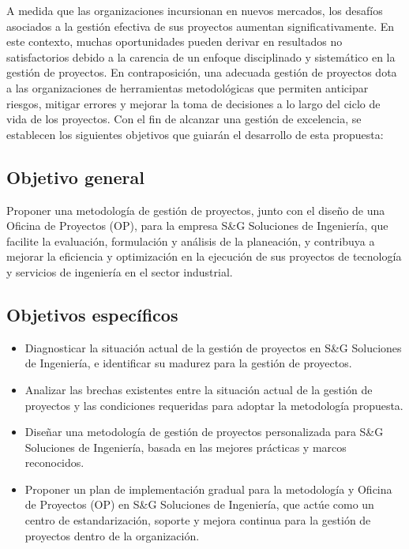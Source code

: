 \begin{flushleft}
A medida que las organizaciones incursionan en nuevos mercados, los desafíos asociados a la gestión efectiva de sus proyectos aumentan significativamente. En este contexto, muchas oportunidades pueden derivar en resultados no satisfactorios debido a la carencia de un enfoque disciplinado y sistemático en la gestión de proyectos. En contraposición, una adecuada gestión de proyectos dota a las organizaciones de herramientas metodológicas que permiten anticipar riesgos, mitigar errores y mejorar la toma de decisiones a lo largo del ciclo de vida de los proyectos.
Con el fin de alcanzar una gestión de excelencia, se establecen los siguientes objetivos que guiarán el desarrollo de esta propuesta:

\subsection*{Objetivo general}
Proponer una metodología de gestión de proyectos, junto con el diseño de una Oficina de Proyectos (OP), para la empresa S\&G Soluciones de Ingeniería, que facilite la evaluación, formulación y análisis de la planeación, y contribuya a mejorar la eficiencia y optimización en la ejecución de sus proyectos de tecnología y servicios de ingeniería en el sector industrial. 

\subsection*{Objetivos específicos}
\begin{itemize}
    \item Diagnosticar la situación actual de la gestión de proyectos en S\&G Soluciones de Ingeniería, e identificar su madurez para la gestión de proyectos.
    \item Analizar las brechas existentes entre la situación actual de la gestión de proyectos y las condiciones requeridas para adoptar la metodología propuesta.
    \item Diseñar una metodología de gestión de proyectos personalizada para S\&G Soluciones de Ingeniería, basada en las mejores prácticas y marcos reconocidos.
    \item Proponer un plan de implementación gradual para la metodología y Oficina de Proyectos (OP) en S\&G Soluciones de Ingeniería, que actúe como un centro de estandarización, soporte y mejora continua para la gestión de proyectos dentro de la organización.
\end{itemize}
\end{flushleft}